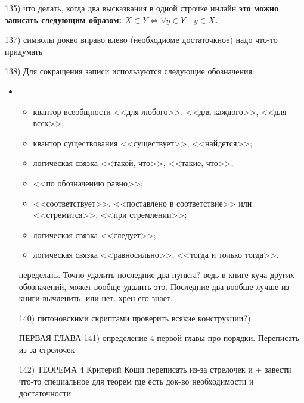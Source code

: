 135) что делать, когда два высказвания в одной строчке инлайн   \textbf{это можно записать следующим образом: $X \subset Y \Longleftrightarrow \forall y\in Y\quad  y\in X$.}

137) символы докво вправо влево (необходиоме достаточкное) надо что-то придумать

138) Для сокращения записи используются следующие обозначения:
\begin{itemize}
\item[]
\begin{itemize}[noitemsep, label = ---]
\item \makebox[0pt][r]{$\forall$\hspace{0.75cm}}
квантор всеобщности <<для любого>>, <<для каждого>>, <<для всех>>;
\item \makebox[0pt][r]{$\exists$\hspace{0.75cm}}
квантор существования  <<существует>>, <<найдется>>;
\item \makebox[0pt][r]{$:$\hspace{0.75cm}}
логическая связка <<такой, что>>, <<такие, что>>;
\item \makebox[0pt][r]{$\triangleq$\hspace{0.75cm}} 
<<по обозначению равно>>;
\item \makebox[0pt][r]{$\to$\hspace{0.75cm}}
<<соответствует>>, <<поставлено в соответствие>> или <<стремится>>, <<при стремлении>>;
\item \makebox[0pt][r]{$\Rightarrow$\hspace{0.75cm}}
логическая связка <<следует>>;
\item \makebox[0pt][r]{$\Longleftrightarrow$\hspace{0.75cm}}
логическая связка <<равносильно>>, <<тогда и только тогда>>.
\end{itemize}

переделать. Точно удалить последние два пункта? ведь в книге куча других обозначений, может вообще удалить это. Последние два вообще лучше из книги вычленить. или нет. хрен его знает.

140) питоновскими скриптами проверить всякие конструкции?)

ПЕРВАЯ ГЛАВА
141) определение 4 первой главы про порядки. Переписать из-за стрелочек

142) ТЕОРЕМА 4 Критерий Коши переписать из-за стрелочек и + завести что-то специальное для теорем где есть док-во необходимости и достаточности


\end{itemize}

